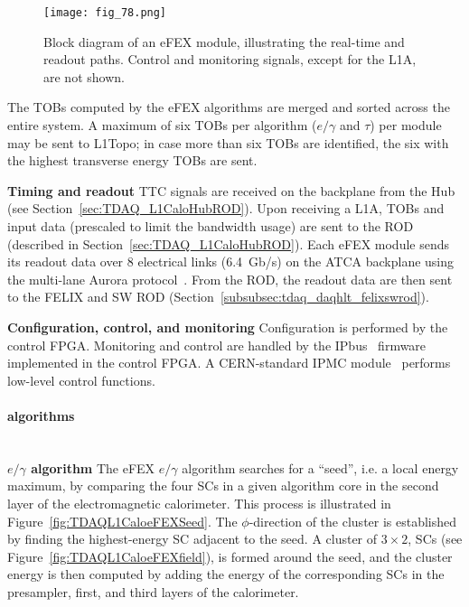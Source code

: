 \documentclass[cernpreprint, atlasdraft=false, UKenglish,british,orcidlogo, texmf, orcidlogo]{atlasdoc}
\begin{document}
\begin{figure}[htbp]
\centerline{\texttt{[image: fig\_78.png]}}
\caption{Block diagram of an \gls{eFEX} module, illustrating the real-time and readout paths.  Control and monitoring signals, except for the \gls{L1A}, are not shown.}
\label{fig:TDAQL1CaloeFEXModule}
\end{figure}
 
The \glspl{TOB} computed by the \gls{eFEX} algorithms are merged and sorted across the entire system.  A maximum of six \glspl{TOB} per algorithm ($e/\gamma$ and $\tau$) per module may be sent to \gls{L1Topo}; in case more than six \glspl{TOB} are identified, the six with the highest transverse energy \glspl{TOB} are sent.
 
\textbf{Timing and readout}  \gls{TTC} signals are received on the backplane from the \gls{Hub} (see Section~\ref{sec:TDAQ_L1CaloHubROD}).  Upon receiving a \gls{L1A}, \glspl{TOB} and input data (prescaled to limit the bandwidth usage) are sent to the \gls{ROD} (described in Section~\ref{sec:TDAQ_L1CaloHubROD}).  Each \gls{eFEX} module sends its readout data over 8 electrical links (\SI{6.4}{Gb/\s}) on the \gls{ATCA} backplane using the multi-lane Aurora protocol~\cite{bib:Aurora}.  From the \gls{ROD}, the readout data are then sent to the \gls{FELIX} and \gls{SW ROD} (Section~\ref{subsubsec:tdaq_daqhlt_felixswrod}).
 
\textbf{Configuration, control, and monitoring} Configuration is performed by the control \gls{FPGA}.  Monitoring and control are handled by the IPbus~\cite{bib:IPbus} firmware implemented in the control \gls{FPGA}.  A CERN-standard \gls{IPMC} module~\cite{bib:CERN-IPMC} performs low-level control functions.
 
\paragraph{ algorithms}\mbox{}\\
\textbf{$e/\gamma$ algorithm}  The \gls{eFEX} $e/\gamma$ algorithm searches for a ``seed'', i.e. a local energy maximum, by comparing the four \glspl{SC} in a given algorithm core in the second layer of the electromagnetic calorimeter.  This process is illustrated in Figure~\ref{fig:TDAQL1CaloeFEXSeed}.  The $\phi$-direction of the cluster is established by finding the highest-energy
\gls{SC} adjacent to the seed.  A cluster of $3 \times 2$, \glspl{SC} (see Figure~\ref{fig:TDAQL1CaloeFEXfield}),  is formed around the seed, and the cluster energy is then computed by adding the energy of the corresponding \glspl{SC} in the presampler, first, and third layers of the calorimeter.
 
\end{document}
